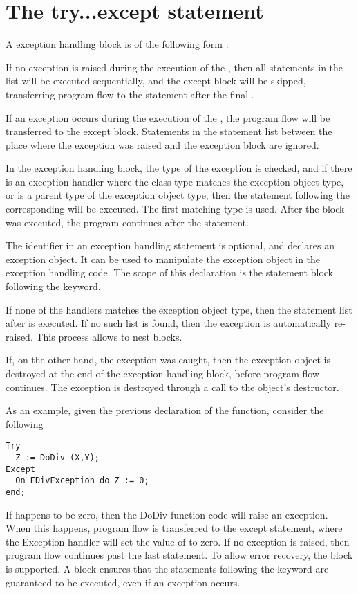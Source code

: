 \section{The try...except statement}
   
A  exception handling block is of the following form :

If no exception is raised during the execution of the ,
then all statements in the list will be executed sequentially, and the
except block will be skipped, transferring program flow to the statement
after the final .

If an exception occurs during the execution of the , the
program flow will be transferred to the except block. Statements in the
statement list between the place where the exception was raised and the
exception block are ignored.

In the exception handling block, the type of the exception is checked,
and if there is an exception handler where the class type matches the
exception object type, or is a parent type of
the exception object type, then the statement following the corresponding
 will be executed. The first matching type is used. After the
 block was executed, the program continues after the 
statement.

The identifier in an exception handling statement is optional, and declares
an exception object. It can be used to manipulate the exception object in
the exception handling code. The scope of this declaration is the statement
block following the  keyword.

If none of the  handlers matches the exception object type, then the
statement list after  is executed. If no such list is
found, then the exception is automatically re-raised. This process allows
to nest  blocks.

If, on the other hand, the exception was caught, then the exception object is
destroyed at the end of the exception handling block, before program flow
continues. The exception is destroyed through a call to the object's
 destructor.

As an example, given the previous declaration of the  function,
consider the following
\begin{verbatim}
Try
  Z := DoDiv (X,Y);
Except
  On EDivException do Z := 0;
end;
\end{verbatim}
If  happens to be zero, then the DoDiv function code will raise an
exception. When this happens, program flow is transferred to the except
statement, where the Exception handler will set the value of  to
zero. If no exception is raised, then program flow continues past the last
 statement.
To allow error recovery, the  block is supported.
A  block ensures that the statements following the
 keyword are guaranteed to be executed, even if an exception
occurs.


